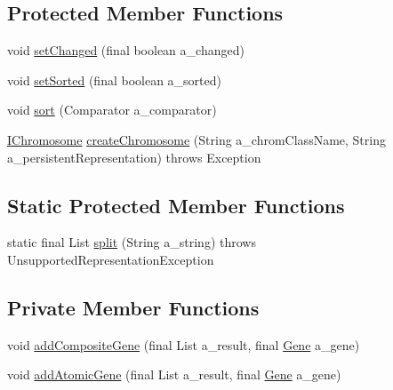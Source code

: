 \subsection*{Protected Member Functions}
\begin{DoxyCompactItemize}
\item 
void \hyperlink{classorg_1_1jgap_1_1_population_adf75c170902a54737483e3e845bcfacc}{set\-Changed} (final boolean a\-\_\-changed)
\item 
void \hyperlink{classorg_1_1jgap_1_1_population_a252f05034adae08bf72577e853adee88}{set\-Sorted} (final boolean a\-\_\-sorted)
\item 
void \hyperlink{classorg_1_1jgap_1_1_population_ae97e76f0bf965b1741a1f98efe05b482}{sort} (Comparator a\-\_\-comparator)
\item 
\hyperlink{interfaceorg_1_1jgap_1_1_i_chromosome}{I\-Chromosome} \hyperlink{classorg_1_1jgap_1_1_population_a62348bfaa285efe11845574496d7a14c}{create\-Chromosome} (String a\-\_\-chrom\-Class\-Name, String a\-\_\-persistent\-Representation)  throws Exception 
\end{DoxyCompactItemize}
\subsection*{Static Protected Member Functions}
\begin{DoxyCompactItemize}
\item 
static final List \hyperlink{classorg_1_1jgap_1_1_population_a8379b53e6b976e681ae6d57c3db6a4ef}{split} (String a\-\_\-string)  throws Unsupported\-Representation\-Exception 
\end{DoxyCompactItemize}
\subsection*{Private Member Functions}
\begin{DoxyCompactItemize}
\item 
void \hyperlink{classorg_1_1jgap_1_1_population_a64e81fff98bc39fcc05071b304b3c167}{add\-Composite\-Gene} (final List a\-\_\-result, final \hyperlink{interfaceorg_1_1jgap_1_1_gene}{Gene} a\-\_\-gene)
\item 
void \hyperlink{classorg_1_1jgap_1_1_population_a18ae527f4110c5d0c525e2a7f61c0553}{add\-Atomic\-Gene} (final List a\-\_\-result, final \hyperlink{interfaceorg_1_1jgap_1_1_gene}{Gene} a\-\_\-gene)
\end{DoxyCompactItemize}
